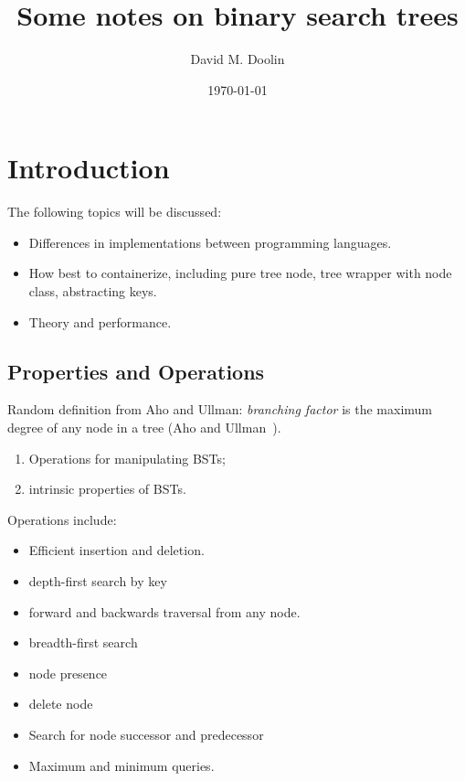 \documentclass{article}
\title{Some notes on binary search trees}
\date{\today}
\author{David M. Doolin}
\begin{document}
\maketitle


\tableofcontents

\section{Introduction}


The following topics will be discussed:

\begin{itemize}

\item Differences in implementations between programming languages.
\item How best to containerize, including pure tree node, tree wrapper with
node class, abstracting keys.
\item Theory and performance.

\end{itemize}

\setcounter{sno}{0}
\newcommand\sno{\stepcounter{sno}$^{\thesno}$}





\subsection{Properties and Operations}

Random definition from Aho and Ullman: \textit{branching factor}
is the maximum degree of any node in a tree (Aho and Ullman~\cite[exercise on
p. 259]{aho:av:1992}).

\begin{enumerate}
\item Operations for manipulating BSTs;
\item intrinsic properties of BSTs.
\end{enumerate}


Operations include:

\begin{itemize}
  \item Efficient insertion and deletion.
  \item depth-first search by key
  \item forward and backwards traversal from any node.
  \item breadth-first search
  \item node presence
  \item delete node
  \item Search for node successor and predecessor
  \item Maximum and minimum queries.
\end{itemize}
\end{document}
